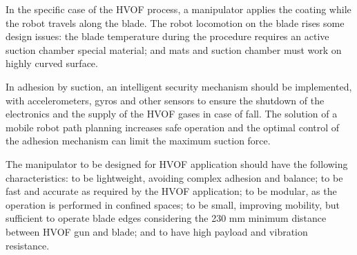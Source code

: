 In the specific case of the HVOF process, a manipulator applies the coating 
while the robot travels along the blade. The robot locomotion on the blade rises
some design issues: the blade temperature during the procedure requires an
active suction chamber special material; and mats and suction chamber must
work on highly curved surface.



In adhesion by suction, an intelligent security mechanism should be implemented,
with accelerometers, gyros and other sensors to ensure the shutdown of the
electronics and the supply of the HVOF gases in case of fall. The solution of a
mobile robot path planning increases safe operation and the optimal control of the adhesion
mechanism can limit the maximum suction force.


The manipulator to be designed for HVOF application should have the following
characteristics: to be lightweight, avoiding complex adhesion and balance;
to be fast and accurate as required by the HVOF application; to be modular, as
the operation is performed in confined spaces; to be small, improving mobility,
but sufficient to operate blade edges considering the 230 mm minimum distance
between HVOF gun and blade; and to have high payload and vibration resistance.


